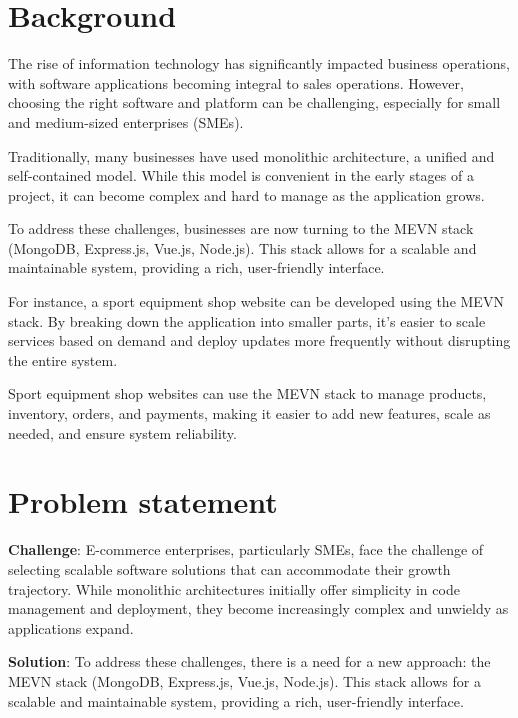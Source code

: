 \section{Background}
The rise of information technology has significantly impacted business operations, with software applications becoming integral to sales operations. However, choosing the right software and platform can be challenging, especially for small and medium-sized enterprises (SMEs).

Traditionally, many businesses have used monolithic architecture, a unified and self-contained model. While this model is convenient in the early stages of a project, it can become complex and hard to manage as the application grows.

To address these challenges, businesses are now turning to the MEVN stack (MongoDB, Express.js, Vue.js, Node.js). This stack allows for a scalable and maintainable system, providing a rich, user-friendly interface.

For instance, a sport equipment shop website can be developed using the MEVN stack. By breaking down the application into smaller parts, it's easier to scale services based on demand and deploy updates more frequently without disrupting the entire system.

Sport equipment shop websites can use the MEVN stack to manage products, inventory, orders, and payments, making it easier to add new features, scale as needed, and ensure system reliability.
\section{Problem statement}
\textbf{Challenge}: E-commerce enterprises, particularly SMEs, face the challenge of selecting scalable software solutions that can accommodate their growth trajectory. While monolithic architectures initially offer simplicity in code management and deployment, they become increasingly complex and unwieldy as applications expand.

\textbf{Solution}: To address these challenges, there is a need for a new approach: the MEVN stack (MongoDB, Express.js, Vue.js, Node.js). This stack allows for a scalable and maintainable system, providing a rich, user-friendly interface.

